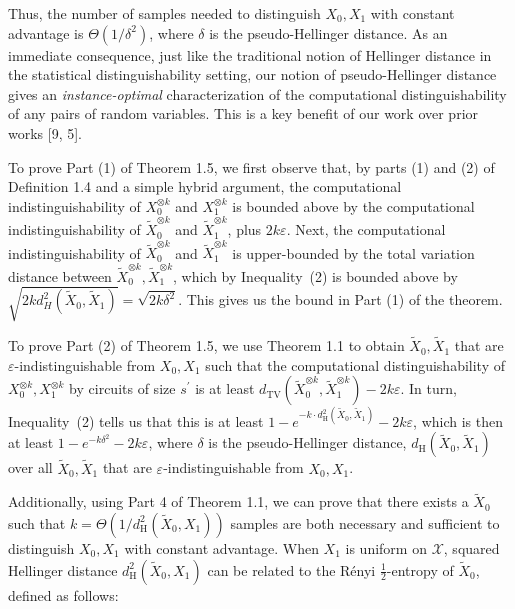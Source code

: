 


Thus, the number of samples needed to distinguish $X_{0},X_{1}$ with constant advantage is $\Theta(1/\delta^{2})$, where $\delta$ is the pseudo-Hellinger distance. As an immediate consequence, just like the traditional notion of Hellinger distance in the statistical distinguishability setting, our notion of pseudo-Hellinger distance gives an \emph{instance-optimal} characterization of the computational distinguishability of any pairs of random variables. This is a key benefit of our work over prior works [9, 5].\par




To prove Part (1) of Theorem 1.5, we first observe that, by parts (1) and (2) of Definition 1.4 and a simple hybrid argument, the computational indistinguishability of $X_{0}^{\otimes k}$ and $X_{1}^{\otimes k}$ is bounded above by the computational indistinguishability of $\widetilde{X}_{0}^{\otimes k}$ and $\widetilde{X}_{1}^{\otimes k}$, plus $2k\varepsilon$. Next, the computational indistinguishability of $\widetilde{X}_{0}^{\otimes k}$ and $\widetilde{X}_{1}^{\otimes k}$ is upper-bounded by the total variation distance between $\widetilde{X}_{0}^{\otimes k},\widetilde{X}_{1}^{\otimes k}$, which by Inequality (2) is bounded above by $\sqrt{2kd_{H}^{2}(\widetilde{X}_{0},\widetilde{X}_{1})}=\sqrt{2k\delta^{2}}$. This gives us the bound in Part (1) of the theorem.\par




To prove Part (2) of Theorem 1.5, we
use Theorem 1.1 to obtain $\widetilde{X}_{0},\widetilde{X}_{1}$ that are $\varepsilon$-indistinguishable from $X_{0},X_{1}$ such that the computational distinguishability of $X_{0}^{\otimes k},X_{1}^{\otimes k}$ by circuits of size $s^{\prime}$ is at least $d_{\mathrm{TV}}(\widetilde{X}_{0}^{\otimes k},\widetilde{X}_{1}^{\otimes k})-2k\varepsilon$. In turn, Inequality (2) tells us that this is at least $1-e^{-k\cdot d^{2}_{\mathrm{H}}(\widetilde{X}_{0},\widetilde{X}_{1})}-2k\varepsilon$, which is then at least $1-e^{-k\delta^{2}}-2k\varepsilon$, where $\delta$ is the pseudo-Hellinger distance, $d_{\mathrm{H}}(\widetilde{X}_{0},\widetilde{X}_{1})$ over all $\widetilde{X}_{0},\widetilde{X}_{1}$ that are $\varepsilon$-indistinguishable from $X_{0},X_{1}$.\par




Additionally, using Part 4 of Theorem 1.1, we can prove that there exists a $\widetilde{X}_{0}$ such that $k=\Theta\left(1/d^{2}_{\mathrm{H}}(\widetilde{X}_{0},X_{1})\right)$ samples are both necessary and sufficient to distinguish $X_{0},X_{1}$ with constant
advantage. When $X_{1}$ is uniform on $\mathcal{X}$, squared Hellinger distance $d^{2}_{\mathrm{H}}(\widetilde{X}_{0},X_{1})$ can be related to the Rényi $\frac{1}{2}$-entropy of $\widetilde{X}_{0}$, defined as follows:\par


